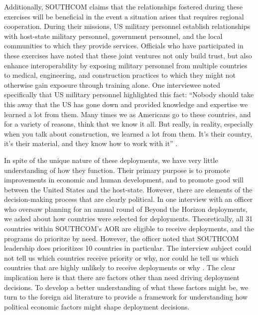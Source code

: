 \documentclass[12pt]{article}
\begin{document}
\begin{doublespace}
Additionally, SOUTHCOM claims that the relationships fostered during these exercises will be beneficial in the event a situation arises that requires regional cooperation. During their missions, US military personnel establish relationships with host-state military personnel, government personnel, and the local communities to which they provide services. Officials who have participated in these exercises have noted that these joint ventures not only build trust, but also enhance interoperability by exposing military personnel from multiple countries to medical, engineering, and construction practices to which they might not otherwise gain exposure through training alone. One interviewee noted specifically that US military personnel highlighted this fact: ``Nobody should take this away that the US has gone down and provided knowledge and expertise we learned a lot from them. Many times we as Americans go to these countries, and for a variety of reasons, think that we know it all. But really, in reality, especially when you talk about construction, we learned a lot from them. It's their country, it's their material, and they know how to work with it'' \cite{LTC20160816}.
 
In spite of the unique nature of these deployments, we have very little understanding of how they function. Their primary purpose is to promote improvements in economic and human development, and to promote good will between the United States and the host-state. However, there are elements of the decision-making process that are clearly political. In one interview with an officer who oversaw planning for an annual round of Beyond the Horizon deployments, we asked about how countries were selected for deployments. Theoretically, all 31 countries within SOUTHCOM's AOR are eligible to receive deployments, and the programs do prioritze by need. However, the officer noted that SOUTHCOM leadership does prioritizes 10 countries in particular. The interview subject could not tell us which countries receive priority or why, nor could he tell us which countries that are highly unlikely to receive deployments or why \cite{CPT20160309}. The clear implication here is that there are factors other than need driving deployment decisions. To develop a better understanding of what these factors might be, we turn to the foreign aid literature to provide a framework for understanding how political economic factors might shape deployment decisions. 


\end{doublespace}
\end{document}
